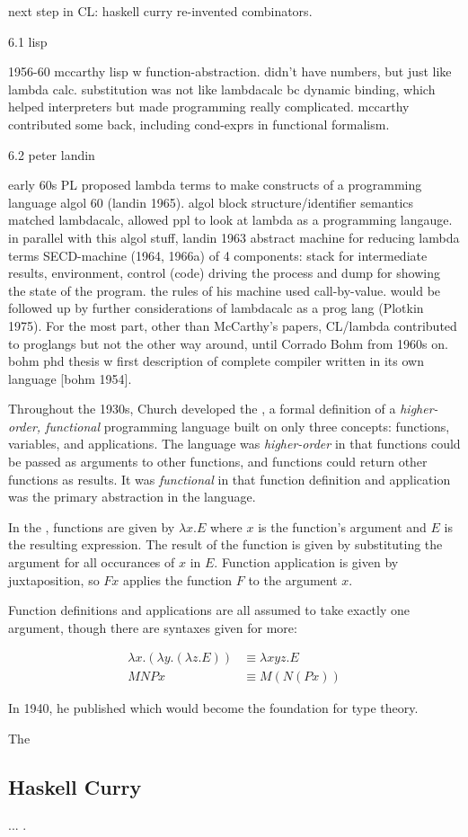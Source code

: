 {	next step in CL: haskell curry re-invented combinators.

	6.1 lisp

	1956-60 mccarthy lisp w function-abstraction.
	didn't have numbers, but just like lambda calc.
	substitution was not like lambdacalc bc dynamic binding, which helped
	interpreters but made programming really complicated.
	mccarthy contributed some back, including cond-exprs in functional formalism.

	6.2 peter landin

	early 60s PL proposed lambda terms to make constructs of a programming language
	algol 60 (landin 1965).
	algol block structure/identifier semantics matched lambdacalc, allowed
	ppl to look at lambda as a programming langauge.
	in parallel with this algol stuff, landin 1963 abstract machine
	for reducing lambda terms SECD-machine (1964, 1966a) of 4 components:
	stack for intermediate results, environment, control (code) driving the process
	and dump for showing the state of the program.
	the rules of his machine used call-by-value.
	would be followed up by further considerations of lambdacalc as a prog lang
	(Plotkin 1975).
	For the most part, other than McCarthy's papers,
	CL/lambda contributed to proglangs but not the other way around,
	until Corrado Bohm from 1960s on.
	bohm phd thesis w first description of complete compiler written in its own language
		[bohm 1954].


}

Throughout the 1930s, Church developed the \textit{\lambdacalc{}},
a formal definition of a \textit{higher-order, functional} programming language
built on only three concepts: functions, variables, and applications.
The language was \textit{higher-order} in that functions could be passed
as arguments to other functions, and functions could return other functions as results.
It was \textit{functional} in that function definition and application was the
primary abstraction in the language.

In the \lambdacalc{}, functions are given by $\lambda x. E$ where $x$ is the function's argument
and $E$ is the resulting expression. The result of the function is given by substituting the
argument for all occurances of $x$ in $E$. Function application is given by juxtaposition,
so $F x$ applies the function $F$ to the argument $x$.

Function definitions and applications are all assumed to take exactly one argument,
though there are syntaxes given for more:

\begin{align}
	\lambda x . (\lambda y . (\lambda z . E)) & \equiv \lambda x y z . E
	\tag{function definition}
	\\
	M N P x                                   & \equiv M (N (P x))
	\tag{function application}
\end{align}

In 1940, he published 
which would become the foundation for type theory.

The \lambdacalc{}

\subsection{Haskell Curry}

...
.
